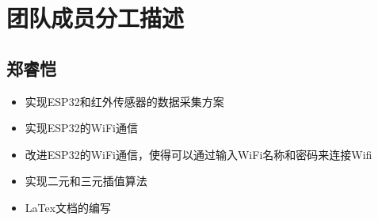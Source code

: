 \chapter{团队成员分工描述}
\section{郑睿恺}
\begin{itemize}
    \item 实现ESP32和红外传感器的数据采集方案
    \item 实现ESP32的WiFi通信
    \item 改进ESP32的WiFi通信，使得可以通过输入WiFi名称和密码来连接Wifi
    \item 实现二元和三元插值算法
    \item LaTex文档的编写
    \end{itemize}








